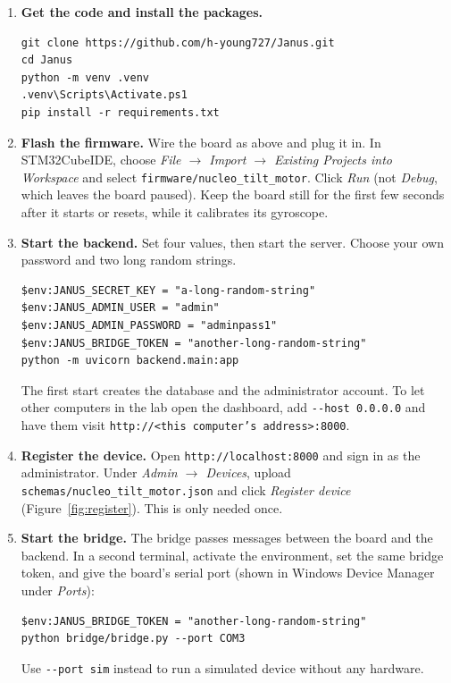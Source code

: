 \documentclass[11pt]{article}
\begin{document}
\begin{enumerate}[leftmargin=1.5em, itemsep=3pt]
\item \textbf{Get the code and install the packages.}
\begin{Verbatim}[samepage=true]
git clone https://github.com/h-young727/Janus.git
cd Janus
python -m venv .venv
.venv\Scripts\Activate.ps1
pip install -r requirements.txt
\end{Verbatim}

\item \textbf{Flash the firmware.} Wire the board as above and plug it in. In STM32CubeIDE, choose \emph{File $\rightarrow$ Import $\rightarrow$ Existing Projects into Workspace} and select \texttt{firmware/nucleo\_tilt\_motor}. Click \emph{Run} (not \emph{Debug}, which leaves the board paused). Keep the board still for the first few seconds after it starts or resets, while it calibrates its gyroscope.

\item \textbf{Start the backend.} Set four values, then start the server. Choose your own password and two long random strings.
\begin{Verbatim}
$env:JANUS_SECRET_KEY = "a-long-random-string"
$env:JANUS_ADMIN_USER = "admin"
$env:JANUS_ADMIN_PASSWORD = "adminpass1"
$env:JANUS_BRIDGE_TOKEN = "another-long-random-string"
python -m uvicorn backend.main:app
\end{Verbatim}
The first start creates the database and the administrator account. To let other computers in the lab open the dashboard, add \texttt{-{}-host 0.0.0.0} and have them visit \texttt{http://<this computer's address>:8000}.

\item \textbf{Register the device.} Open \texttt{http://localhost:8000} and sign in as the administrator. Under \emph{Admin $\rightarrow$ Devices}, upload \texttt{schemas/nucleo\_tilt\_motor.json} and click \emph{Register device} (Figure~\ref{fig:register}). This is only needed once.

\item \textbf{Start the bridge.} The bridge passes messages between the board and the backend. In a second terminal, activate the environment, set the same bridge token, and give the board's serial port (shown in Windows Device Manager under \emph{Ports}):
\begin{Verbatim}
$env:JANUS_BRIDGE_TOKEN = "another-long-random-string"
python bridge/bridge.py --port COM3
\end{Verbatim}
Use \texttt{-{}-port sim} instead to run a simulated device without any hardware.
\end{enumerate}
\end{document}
